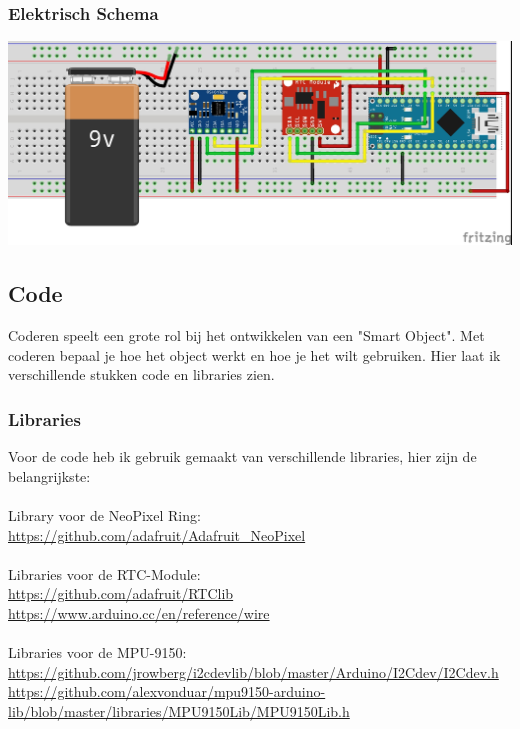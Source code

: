\documentclass[a4paper,12pt]{article}
\begin{document}
\subsubsection{Elektrisch Schema}
\includegraphics{circuit_bb}
\subsection{Code}
Coderen speelt een grote rol bij het ontwikkelen van een "Smart Object".
Met coderen bepaal je hoe het object werkt en hoe je het wilt gebruiken.
Hier laat ik verschillende stukken code en libraries zien.
\subsubsection{Libraries}
Voor de code heb ik gebruik gemaakt van verschillende libraries, hier zijn de belangrijkste: 
\\ \\
Library voor de NeoPixel Ring:\\
\url{https://github.com/adafruit/Adafruit_NeoPixel}
\\ \\
Libraries voor de RTC-Module:\\
\url{https://github.com/adafruit/RTClib}\\
\url{https://www.arduino.cc/en/reference/wire}
\\ \\
Libraries voor de MPU-9150:\\
\url{https://github.com/jrowberg/i2cdevlib/blob/master/Arduino/I2Cdev/I2Cdev.h}\\
\url{https://github.com/alexvonduar/mpu9150-arduino-lib/blob/master/libraries/MPU9150Lib/MPU9150Lib.h}
\end{document}
